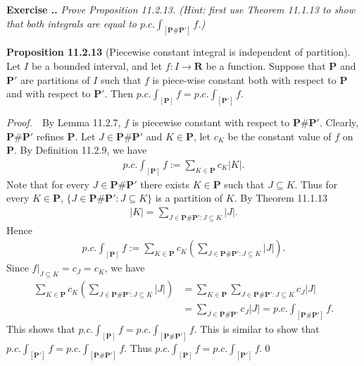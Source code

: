 \documentclass{book}
\newcommand{\pff}{\vspace{.25em}\noindent\emph{Proof.}~~}
\newcommand{\titl}[1]{\noindent\textbf{#1}}
\newcounter{Exercise}[section]
\renewcommand{\theExercise}{\thesection.\arabic{Exercise}.}
\newcommand{\new}{\vspace{1.5em}\noindent\textbf{{Exercise \stepcounter{Exercise}\textbf{\theExercise}}} }
\begin{document}
\new\emph{Prove Proposition 11.2.13. (Hint: first use Theorem 11.1.13 to show that both integrals are equal to $p.c.\int_{[\mathbf{P}\#\mathbf{P'}]}f$.)}

\begin{framed}
\titl{Proposition 11.2.13} (Piecewise constant integral is independent of partition). Let $I$ be a bounded interval, and let $f:I\to\mathbf{R}$ be a function. Suppose that $\mathbf{P}$ and $\mathbf{P'}$ are partitions of $I$ such that $f$ is piece-wise constant both with respect to $\mathbf{P}$ and with respect to $\mathbf{P'}$. Then $p.c.\int_{[\mathbf{P}]}f=p.c.\int_{[\mathbf{P'}]}f$.
\end{framed}

\pff By Lemma 11.2.7, $f$ is piecewise constant with respect to $\mathbf{P}\#\mathbf{P'}$. Clearly, $\mathbf{P}\#\mathbf{P'}$ refines $\mathbf{P}$. Let $J\in\mathbf{P}\#\mathbf{P'}$ and $K\in\mathbf{P}$, let $c_K$ be the constant value of $f$ on $\mathbf{P}$. By Definition 11.2.9, we have
    \begin{align*}
        p.c.\int_{[\mathbf{P}]}f:=\sum_{K\in\mathbf{P}}c_{K}|K|.
    \end{align*}
Note that for every $J\in\mathbf{P}\#\mathbf{P'}$ there exists $K\in\mathbf{P}$ such that $J\subseteq K$. Thus for every $K\in\mathbf{P}$, $\{J\in\mathbf{P}\#\mathbf{P'}:J\subseteq K\}$ is a partition of $K$. By Theorem 11.1.13
    \begin{align*}
        |K|=\sum_{J\in\mathbf{P}\#\mathbf{P'}:J\subseteq K}|J|.
    \end{align*}
Hence
    \begin{align*}
        p.c.\int_{[\mathbf{P}]}f:=\sum_{K\in\mathbf{P}}c_{K}\left(\sum_{J\in\mathbf{P}\#\mathbf{P'}:J\subseteq K}|J|\right).
    \end{align*}
Since $f|_{J\subseteq K}=c_J=c_K$, we have
    \begin{align*}
        \sum_{K\in\mathbf{P}}c_{K}\left(\sum_{J\in\mathbf{P}\#\mathbf{P'}:J\subseteq K}|J|\right)
        &=\sum_{K\in\mathbf{P}}\sum_{J\in\mathbf{P}\#\mathbf{P'}:J\subseteq K}c_{J}|J|\\
        &=\sum_{J\in\mathbf{P}\#\mathbf{P'}}c_{J}|J|
        =p.c.\int_{[\mathbf{P}\#\mathbf{P'}]}f.
    \end{align*}
This shows that $p.c.\int_{[\mathbf{P}]}f=p.c.\int_{[\mathbf{P}\#\mathbf{P'}]}f$. This is similar to show that $p.c.\int_{[\mathbf{P'}]}f=p.c.\int_{[\mathbf{P}\#\mathbf{P'}]}f$. Thus $p.c.\int_{[\mathbf{P}]}f=p.c.\int_{[\mathbf{P'}]}f$.\qed
\end{document}
